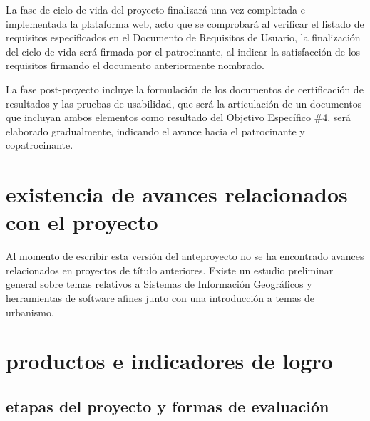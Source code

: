 \documentclass[12pt]{article}
\begin{document}
La fase de ciclo de vida del proyecto finalizará una vez completada e
implementada la
plataforma web, acto que se comprobará al verificar el listado de requisitos
especificados en el Documento de Requisitos de Usuario, la finalización del
ciclo de vida será firmada por el patrocinante, al indicar la satisfacción de
los requisitos firmando el documento anteriormente nombrado.

La fase post-proyecto incluye la formulación de los documentos de certificación
de resultados y las pruebas de usabilidad, que será la articulación de un
documentos que incluyan ambos elementos como resultado del Objetivo Específico
\#4, será elaborado gradualmente, indicando el avance hacia el patrocinante y
copatrocinante.

\newpage
\section{existencia de avances relacionados con el proyecto}
Al momento de escribir esta versión del anteproyecto no se ha encontrado avances
relacionados en proyectos de título anteriores. Existe un estudio preliminar
general sobre temas relativos a Sistemas de Información Geográficos y
herramientas de software afines junto con una introducción a temas de urbanismo.

\newpage
\section{productos e indicadores de logro}
\subsection{etapas del proyecto y formas de evaluación}
\end{document}
